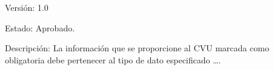 \documentclass[10pt,spanish]{article}
\begin{document}
	\begin{flushleft}
	Versión: 1.0
	\par\end{flushleft}

	\begin{flushleft}
	Estado: Aprobado.
	\par\end{flushleft}

	\begin{flushleft}
	Descripción: La información que se proporcione al CVU marcada como
	obligatoria debe pertenecer al tipo de dato especificado \ldots{}. 
	\par\end{flushleft}

\end{document}
